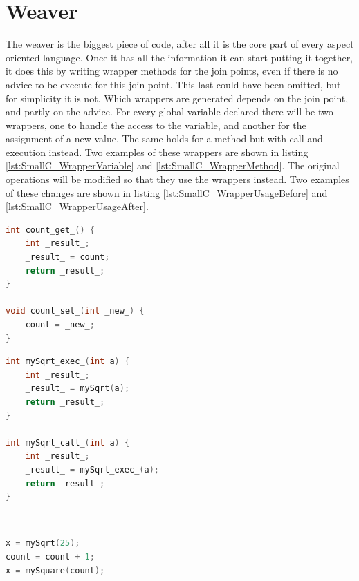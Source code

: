 \documentclass[a4paper]{report}
\begin{document}
\section{Weaver}
The weaver is the biggest piece of code, after all it is the core part of every aspect oriented language. Once it has all the information it can start putting it together, it does this by writing wrapper methods for the join points, even if there is no advice to be execute for this join point. This last could have been omitted, but for simplicity it is not. Which wrappers are generated depends on the join point, and partly on the advice. For every global variable declared there will be two wrappers, one to handle the access to the variable, and another for the assignment of a new value. The same holds for a method but with call and execution instead. Two examples of these wrappers are shown in listing \ref{lst:SmallC_WrapperVariable} and \ref{lst:SmallC_WrapperMethod}. The original operations will be modified so that they use the wrappers instead. Two examples of these changes are shown in listing \ref{lst:SmallC_WrapperUsageBefore} and \ref{lst:SmallC_WrapperUsageAfter}.\\
\begin{minipage}{0.45\textwidth}
\begin{lstlisting}[language=C, caption=Example of variable wrappers, label=lst:SmallC_WrapperVariable]
int count_get_() {
	int _result_;
	_result_ = count;
	return _result_;
}

void count_set_(int _new_) {
	count = _new_;
}
\end{lstlisting}
\end{minipage}\hfill
\begin{minipage}{0.45\textwidth}
\begin{lstlisting}[language=C, caption=Example of method wrappers, label=lst:SmallC_WrapperMethod]
int mySqrt_exec_(int a) {
	int _result_;
	_result_ = mySqrt(a);
	return _result_;
}

int mySqrt_call_(int a) {
	int _result_;
	_result_ = mySqrt_exec_(a);
	return _result_;
}
\end{lstlisting}
\end{minipage}\\
\begin{minipage}{0.45\textwidth}
\begin{lstlisting}[language=C, caption=Example of code before weaving, label=lst:SmallC_WrapperUsageBefore]
x = mySqrt(25);
count = count + 1;
x = mySquare(count);
\end{lstlisting}
\end{minipage}\hfill
\end{document}
